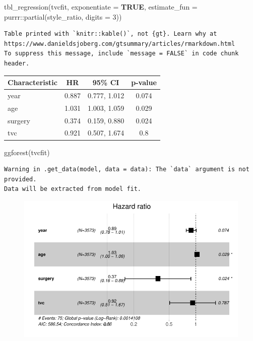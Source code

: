 \documentclass[
  12pt,
  letterpaper,
  DIV=11,
  numbers=noendperiod,
  onepage,
  openany]{scrreprt}
\newenvironment{Shaded}{\begin{snugshade}}{\end{snugshade}}
\newcommand{\AttributeTok}[1]{\textcolor[rgb]{0.80,0.80,0.80}{#1}}
\newcommand{\ConstantTok}[1]{\textcolor[rgb]{0.86,0.64,0.64}{\textbf{#1}}}
\newcommand{\DecValTok}[1]{\textcolor[rgb]{0.86,0.86,0.80}{#1}}
\newcommand{\FunctionTok}[1]{\textcolor[rgb]{0.94,0.94,0.56}{#1}}
\newcommand{\NormalTok}[1]{\textcolor[rgb]{0.80,0.80,0.80}{#1}}
\newcommand{\SpecialCharTok}[1]{\textcolor[rgb]{0.86,0.64,0.64}{#1}}
\begin{document}
\begin{Shaded}
\begin{Highlighting}[]
\FunctionTok{tbl\_regression}\NormalTok{(tvcfit, }\AttributeTok{exponentiate =} \ConstantTok{TRUE}\NormalTok{, }\AttributeTok{estimate\_fun =}\NormalTok{ purrr}\SpecialCharTok{::}\FunctionTok{partial}\NormalTok{(style\_ratio, }\AttributeTok{digits =} \DecValTok{3}\NormalTok{))}
\end{Highlighting}
\end{Shaded}

\begin{verbatim}
Table printed with `knitr::kable()`, not {gt}. Learn why at
https://www.danieldsjoberg.com/gtsummary/articles/rmarkdown.html
To suppress this message, include `message = FALSE` in code chunk header.
\end{verbatim}

\begin{longtable}[]{@{}lccc@{}}
\toprule\noalign{}
\textbf{Characteristic} & \textbf{HR} & \textbf{95\% CI} &
\textbf{p-value} \\
\midrule\noalign{}
\endhead
\bottomrule\noalign{}
\endlastfoot
year & 0.887 & 0.777, 1.012 & 0.074 \\
age & 1.031 & 1.003, 1.059 & 0.029 \\
surgery & 0.374 & 0.159, 0.880 & 0.024 \\
tvc & 0.921 & 0.507, 1.674 & 0.8 \\
\end{longtable}

\begin{Shaded}
\begin{Highlighting}[]
\FunctionTok{ggforest}\NormalTok{(tvcfit)}
\end{Highlighting}
\end{Shaded}

\begin{verbatim}
Warning in .get_data(model, data = data): The `data` argument is not provided.
Data will be extracted from model fit.
\end{verbatim}

\begin{figure}[H]

{\centering \includegraphics{14-R_files/figure-pdf/unnamed-chunk-27-1.pdf}

}

\end{figure}
\end{document}

